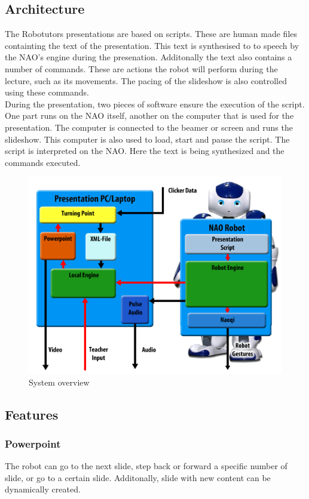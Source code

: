 \subsection{Architecture}
The Robotutors presentations are based on scripts. These are human made files containting the text of the presentation. This text is synthesised to to speech by the NAO's engine during the presenation. Additonally the text also contains a number of commands. These are actions the robot will perform during the lecture, such as its movements. The pacing of the slideshow is also controlled using these commands.\\
During the presentation, two pieces of software ensure the execution of the script. One part runs on the NAO itself, another on the computer that is used for the presentation. The computer is connected to the beamer or screen and runs the slideshow. This computer is also used to load, start and pause the script. The script is interpreted on the NAO. Here the text is being synthesized and the commands executed.

\begin{figure}
	\includegraphics[scale=0.1]{images/system_overview.png}
	\caption{System overview}
\end{figure}


\subsection{Features}
\subsubsection{Powerpoint}
The robot can go to the next slide, step back or forward a specific number of slide, or go to a certain slide. Additonally, slide with new content can be dynamically created.

